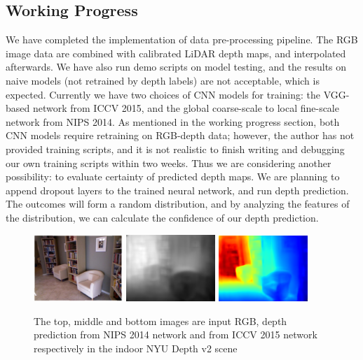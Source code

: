 \documentclass[letterpaper, 10 pt, conference]{ieeeconf}
\begin{document}
\subsection{Working Progress}
We have completed the implementation of data pre-processing pipeline. The RGB image data are combined with calibrated LiDAR depth maps, and interpolated afterwards. We have also run demo scripts on model testing, and the results on naive models (not retrained by depth labels) are not acceptable, which is expected. Currently we have two choices of CNN models for training: the VGG-based network from ICCV 2015\cite{iccv2015}, and the global coarse-scale to local fine-scale network from NIPS 2014\cite{nips2014}. As mentioned in the working progress section, both CNN models require retraining on RGB-depth data; however, the author has not provided training scripts, and it is not realistic to finish writing and debugging our own training scripts within two weeks. Thus we are considering another possibility: to evaluate certainty of predicted depth maps. We are planning to append dropout layers to the trained neural network, and run depth prediction. The outcomes will form a random distribution, and by analyzing the features of the distribution, we can calculate the confidence of our depth prediction.
\begin{figure}
\centering
\includegraphics[width=0.3\textwidth]{demo_nyud_rgb.jpg}
\includegraphics[width=0.3\textwidth]{demo_nyud_depth_prediction.png}
\includegraphics[width=0.3\textwidth]{demo_depth_prediction.png}
\caption{\label{fig:nyuoutput}The top, middle and bottom images are input RGB, depth prediction from NIPS 2014 network and from ICCV 2015 network respectively in the indoor NYU Depth v2 scene}
\end{figure}
\end{document}
